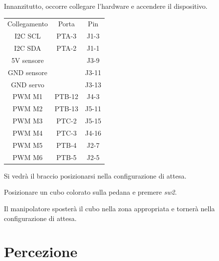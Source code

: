\documentclass[12pt]{report}
\begin{document}
Innanzitutto, occorre collegare l'hardware e accendere il dispositivo.

\begin{table}[h]
\centering
\begin{tabular}{|c|c|c|}
    Collegamento & Porta & Pin \\
    I2C SCL & PTA-3 & J1-3 \\
    I2C SDA & PTA-2 & J1-1 \\
    5V sensore &  & J3-9 \\
    GND sensore &  & J3-11 \\
    GND servo &  & J3-13 \\
    PWM M1 & PTB-12 & J4-3 \\
    PWM M2 & PTB-13 & J5-11 \\
    PWM M3 & PTC-2 & J5-15 \\
    PWM M4 & PTC-3 & J4-16 \\
    PWM M5 & PTB-4 & J2-7 \\
    PWM M6 & PTB-5 & J2-5 \\

\end{tabular}
\end{table}

Si vedrà il braccio posizionarsi nella configurazione di attesa.

Posizionare un cubo colorato sulla pedana e premere \emph{sw2}.

Il manipolatore sposterà il cubo nella zona appropriata e tornerà nella configurazione di attesa.

\chapter{Percezione}
\end{document}
